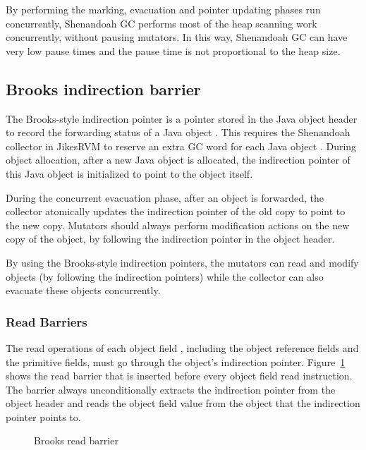By performing the marking, evacuation and pointer updating phases run concurrently, Shenandoah GC performs
most of the heap scanning work concurrently, without pausing mutators. In this way,
Shenandoah GC can have very low pause times and the pause time is not proportional
to the heap size.

\subsection{Brooks indirection barrier}


The Brooks-style indirection pointer is a pointer stored in the Java object header
to record the forwarding status of a Java object \citep{brooks1984trading}.
This requires the Shenandoah collector in JikesRVM to reserve an extra GC word for each
Java object \citep{flood2016shenandoah}. During object allocation, after a new Java object is allocated, the indirection
pointer of this Java object is initialized to point to the object itself.

During the concurrent evacuation phase, after an object is forwarded,
the collector atomically updates the indirection pointer of the old copy to point to the new copy.
Mutators should always perform modification actions on the new copy of the object,
by following the indirection pointer in the object header.

By using the Brooks-style indirection pointers, the mutators can read and modify objects
(by following the indirection pointers) while the collector can also evacuate these
objects concurrently.

\subsubsection{Read Barriers}

The read operations of each object field , including the object
reference fields and the primitive fields, must go through the object's indirection pointer.
Figure~\ref{fig:brooksreadbarrier} shows the read barrier that is inserted before every object field read instruction.
The barrier always unconditionally extracts the indirection pointer from the object header
and reads the object field value from the object that the indirection pointer points to.

\begin{figure}
  \centering
  
  \caption{Brooks read barrier}
  \label{fig:brooksreadbarrier}
\end{figure}


